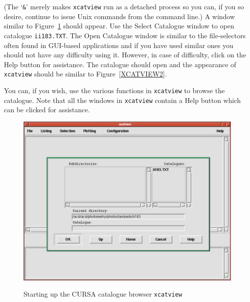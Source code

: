 \documentclass[twoside,11pt,nolof]{starlink}
\begin{document}
\begin{enumerate}
\begin{terminalv}
\end{terminalv}

   (The `\texttt{\&}' merely makes \texttt{xcatview} run as a detached process
   so you can, if you so desire, continue to issue Unix commands from the
   command line.)  A window similar to Figure~\ref{XCATVIEW1} should
   appear.  Use the \textsf{Select Catalogue} window to open catalogue \texttt{ii183.TXT}.  The \textsf{Open Catalogue} window is similar to the
   file-selectors often found in GUI-based applications and if you have
   used similar ones you should not have any difficulty using it.
   However, in case of difficulty, click on the \textsf{Help} button for
   assistance.  The catalogue should open and the appearance of \texttt{xcatview} should be similar to Figure~\ref{XCATVIEW2}.

   You can, if you wish, use the various functions in \texttt{xcatview}
   to browse the catalogue.  Note that all the windows in \texttt{xcatview}
   contain a \textsf{Help} button which can be clicked for assistance.

  \begin{figure}[htbp]
     \centering
     \includegraphics[totalheight=3.25in]{sc6_xcatview1}
     \begin{quote}
     \caption{Starting up the CURSA catalogue browser \texttt{xcatview}
     \label{XCATVIEW1} }
     \end{quote}
  \end{figure}


\end{enumerate}
\end{document}

